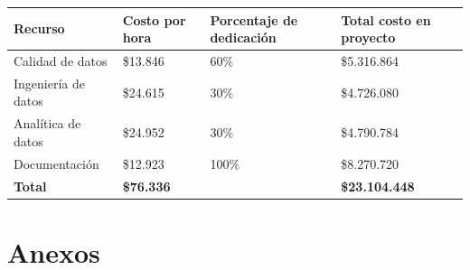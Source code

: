 \documentclass[11pt,letterpaper,oneside]{article}
\begin{document}
	\begin{center}
	\begin{tabular}{ |p{3cm}|p{3cm}|p{3cm}|p{3cm}| }
	 \hline
	 \textbf{Recurso} 
	 & \textbf{Costo por hora} 
	 & \textbf{Porcentaje de dedicación} 
	 & \textbf{Total costo en proyecto}\\ 
	 \hline
	 
	 Calidad de datos 
	 & \$13.846 
	 & 60\% 
	 & \$5.316.864 \\ \hline
	 
	 Ingeniería de datos 
	 & \$24.615 
	 & 30\% 
	 & \$4.726.080 \\ \hline
	 
	 Analítica de datos 
	 & \$24.952
	 & 30\%
	 & \$4.790.784 \\ \hline
	 
	 Documentación 
	 & \$12.923 
	 & 100\% 
	 & \$8.270.720 \\ \hline
	 
	 \textbf{Total} & \textbf{\$76.336} &  & \textbf{\$23.104.448} \\ \hline
	 
	\end{tabular}
	\end{center}
	
	\section{Anexos}
	
\end{document}

